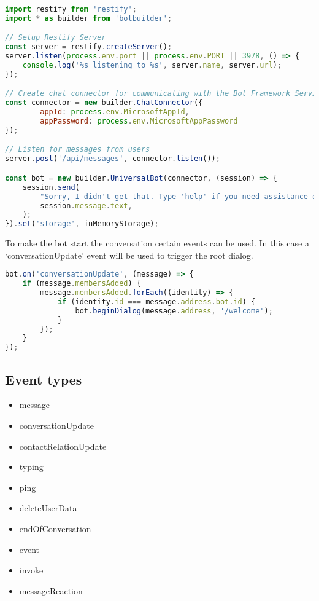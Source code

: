 \begin{lstlisting}[language=JavaScript,caption=Initialization of the chatbot,label=listing:botframework-init]
import restify from 'restify';
import * as builder from 'botbuilder';

// Setup Restify Server
const server = restify.createServer();
server.listen(process.env.port || process.env.PORT || 3978, () => {
	console.log('%s listening to %s', server.name, server.url); 
});

// Create chat connector for communicating with the Bot Framework Service
const connector = new builder.ChatConnector({
		appId: process.env.MicrosoftAppId,
		appPassword: process.env.MicrosoftAppPassword
});

// Listen for messages from users 
server.post('/api/messages', connector.listen());

const bot = new builder.UniversalBot(connector, (session) => {
	session.send(
		"Sorry, I didn't get that. Type 'help' if you need assistance or try a different sentence.",
		session.message.text,
	);
}).set('storage', inMemoryStorage);
\end{lstlisting}

To make the bot start the conversation certain events can be used. In this case a `conversationUpdate' event will be used to trigger the root dialog.

\begin{lstlisting}[language=JavaScript,caption=Initial message,label=listing:botframework-init-message]
bot.on('conversationUpdate', (message) => {
	if (message.membersAdded) {
		message.membersAdded.forEach((identity) => {
			if (identity.id === message.address.bot.id) {
				bot.beginDialog(message.address, '/welcome');
			}
		});
	}
});
\end{lstlisting}

\newpage

\subsection{Event types}
\begin{itemize}
	\item message
	\item conversationUpdate
	\item contactRelationUpdate
	\item typing
	\item ping
	\item deleteUserData
	\item endOfConversation
	\item event
	\item invoke
	\item messageReaction
\end{itemize}

